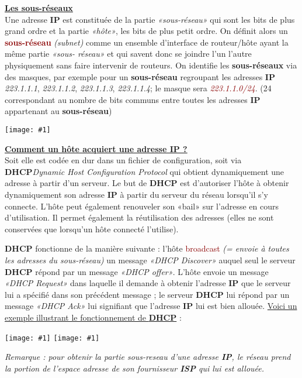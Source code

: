 \documentclass{article}
\newcommand{\dred}[1]{\textcolor{darkred}{\textbf{#1}}}
\newcommand{\red}[1]{\textcolor{darkred}{#1}}
\newcommand{\imageR}[2]{\texttt{[image: \#1]}}
\newcommand{\imgR}[2]{\begin{center}\texttt{[image: \#1]}\end{center}}
\begin{document}
\textbf{\underline{Les sous-réseaux}} \\

Une adresse \textbf{IP} est constituée de la partie \textit{«sous-réseau»} qui sont les bits de plus grand ordre 
et la partie \textit{«hôte»}, les bits de plus petit ordre. On définit alors un \dred{sous-réseau} 
\textit{(subnet)} comme un ensemble d'interface de routeur/hôte ayant la même partie \textit{«sous-
réseau»} et qui savent donc se joindre l'un l'autre physiquement sans faire intervenir de routeurs. On identifie
les \textbf{sous-réseaux} via des masques, par exemple pour un \textbf{sous-réseau} regroupant les adresses 
\textbf{IP} \textit{223.1.1.1}, \textit{223.1.1.2}, \textit{223.1.1.3}, \textit{223.1.1.4}; le masque sera 
\red{\textit{223.1.1.0/24}}. (24 correspondant au nombre de bits communs entre toutes les adresses \textbf{IP} 
appartenant au \textbf{sous-réseau})

\imgR{CN_077.png}{150}

\textbf{\underline{Comment un hôte acquiert une adresse IP ?}} \\

Soit elle est codée en dur dans un fichier de configuration, soit via \textbf{DHCP}\textit{Dynamic Host 
Configuration Protocol} qui obtient dynamiquement une adresse à partir d'un serveur. Le but de \textbf{DHCP} est 
d'autoriser l'hôte à obtenir dynamiquement son adresse \textbf{IP} à partir du serveur du réseau lorsqu'il s'y
connecte. L'hôte peut également renouveler son «bail» sur l'adresse en cours d'utilisation. Il permet également
la réutilisation des adresses (elles ne sont conservées que lorsqu'un hôte connecté l'utilise).

\textbf{DHCP} fonctionne de la manière suivante : l'hôte \red{broadcast} \textit{(= envoie à toutes les adresses 
du sous-réseau)} un message \textit{«DHCP Discover»} auquel seul le serveur \textbf{DHCP} répond par un message 
\textit{«DHCP offer»}. L'hôte envoie un message \textit{«DHCP Request»} dans laquelle il demande à obtenir
l'adresse \textbf{IP} que le serveur lui a spécifié dans son précédent message ; le serveur \textbf{DHCP} lui 
répond par un message \textit{«DHCP Ack»} lui signifiant que l'adresse \textbf{IP} lui est bien allouée.
\newpage
\underline{Voici un exemple illustrant le fonctionnement de \textbf{DHCP}} : 

\imageR{CN_078.png}{200} \imageR{CN_079.png}{250}

\noindent\textit{Remarque : pour obtenir la partie sous-reseau d'une adresse \textbf{IP}, le réseau prend la 
portion de l'espace adresse de son fournisseur \textbf{ISP} qui lui est allouée.}
\end{document}

